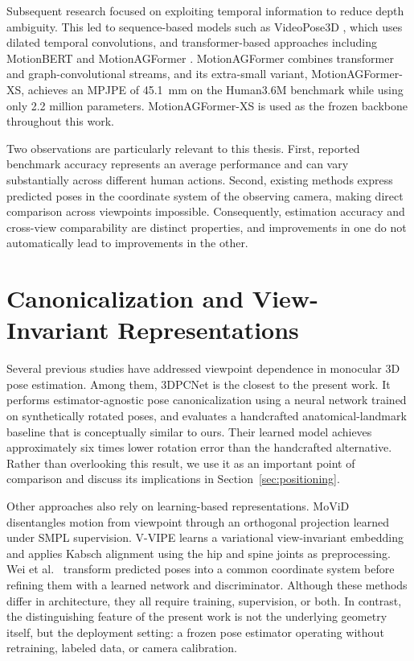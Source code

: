 \documentclass[12pt,a4paper]{report}
\begin{document}
Subsequent research focused on exploiting temporal information to reduce depth ambiguity. This led to sequence-based models such as VideoPose3D \cite{videopose}, which uses dilated temporal convolutions, and transformer-based approaches including MotionBERT \cite{motionbert} and MotionAGFormer \cite{motionagformer}. MotionAGFormer combines transformer and graph-convolutional streams, and its extra-small variant, MotionAGFormer-XS, achieves an MPJPE of 45.1~mm on the Human3.6M benchmark while using only 2.2 million parameters. MotionAGFormer-XS is used as the frozen backbone throughout this work.

Two observations are particularly relevant to this thesis. First, reported benchmark accuracy represents an average performance and can vary substantially across different human actions. Second, existing methods express predicted poses in the coordinate system of the observing camera, making direct comparison across viewpoints impossible. Consequently, estimation accuracy and cross-view comparability are distinct properties, and improvements in one do not automatically lead to improvements in the other.

\section{Canonicalization and View-Invariant Representations}

Several previous studies have addressed viewpoint dependence in monocular 3D pose estimation. Among them, 3DPCNet \cite{3dpcnet} is the closest to the present work. It performs estimator-agnostic pose canonicalization using a neural network trained on synthetically rotated poses, and evaluates a handcrafted anatomical-landmark baseline that is conceptually similar to ours. Their learned model achieves approximately six times lower rotation error than the handcrafted alternative. Rather than overlooking this result, we use it as an important point of comparison and discuss its implications in Section~\ref{sec:positioning}.

Other approaches also rely on learning-based representations. MoViD \cite{3dpcnet2} disentangles motion from viewpoint through an orthogonal projection learned under SMPL \cite{smpl} supervision. V-VIPE \cite{vvipe} learns a variational view-invariant embedding and applies Kabsch alignment using the hip and spine joints as preprocessing. Wei et al.~\cite{vihc} transform predicted poses into a common coordinate system before refining them with a learned network and discriminator. Although these methods differ in architecture, they all require training, supervision, or both. In contrast, the distinguishing feature of the present work is not the underlying geometry itself, but the deployment setting: a frozen pose estimator operating without retraining, labeled data, or camera calibration.
\end{document}
